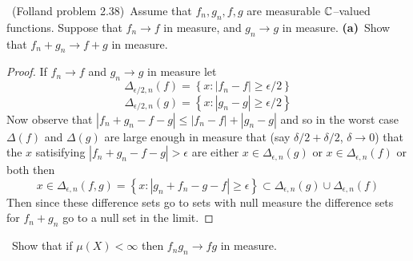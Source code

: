 \documentclass[11pt]{amsart}
\theoremstyle{definition}
\numberwithin{theorem}{section}
\numberwithin{definition}{section}
\numberwithin{equation}{section}
\def\complex{{\mathbb C}\/}
\newcommand{\set}[1]{ \left\{ #1 \right\} }
\begin{document}
\medskip {}\ (Folland problem 2.38)\ 
Assume that $f_n,g_n,f,g$ are measurable $\complex$--valued functions.
Suppose that $f_n\to f$ in measure, and $g_n\to g$ in measure.
\newline
{\bf (a)}\  Show that $f_n+g_n\to f+g$ in measure.
\begin{proof}
	If $f_n \to f$ and $g_n \to g$ in measure let
	$$\Delta_{\epsilon/2, n}(f) =  \set{x\mathrel{}:\mathrel{}\left|f_n -f \right|\geq \epsilon/2}$$
	$$\Delta_{\epsilon/2, n}(g) =  \set{x\mathrel{}:\mathrel{}\left|g_n -g \right|\geq \epsilon/2}$$
	Now observe that $|f_n +g_n - f - g| \leq |f_n -f| + |g_n - g| $ 
	and so in the worst case $\Delta(f)$ and $\Delta(g)$ are large enough in measure that (say $\delta/2 + \delta/2$, $\delta \to 0$) that the $x$ satisifying  $|f_n +g_n - f -g|  > \epsilon $ are either $x \in\Delta_{\epsilon, n}(g) $ or $x \in \Delta_{\epsilon, n}(f) $ or both then
	$$x \in \Delta_{\epsilon, n}(f,g) =  \set{x\mathrel{}:\mathrel{}\left|g_n + f_n -g -f \right|\geq \epsilon} \subset  \Delta_{\epsilon, n}(g) \cup \Delta_{\epsilon, n}(f)$$
	Then since these difference sets go to sets with null measure the difference sets for $f_n +g_n$ go to a null set in the limit.

\end{proof}
\  Show that if $\mu(X)<\infty$ then $f_ng_n\to fg$ in measure.
\end{document}
